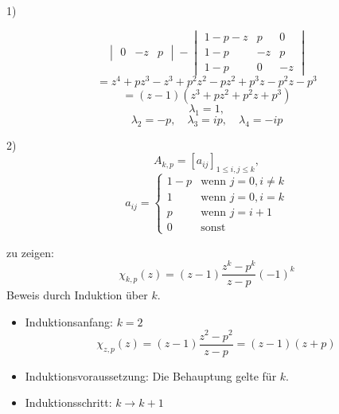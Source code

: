\begin{paragraph}{1)}
\begin{minipage}{0.5\linewidth}
\[\begin{vmatrix}
                                      0 &-z & p \end{vmatrix} 
                     -\begin{vmatrix} 1-p-z & p & 0 \\
                                      1-p & -z & p \\
                                      1-p & 0 & -z \end{vmatrix} \]
  \[ = z^4 + pz^3 - z^3 + p^{2}z^2 - pz^2 + p^{3}z - p^{2}z -p^3 \]
  \[ = (z - 1) (z^{3} + pz^{2} + p^{2}z + p^{3}) \]
  \[ \lambda_{1}= 1, \]
  \[ \lambda_{2}= -p, \quad
     \lambda_{3}= ip, \quad
     \lambda_{4}= -ip\]
  \end{minipage}
\end{paragraph}
\begin{paragraph}{2)}
  \[ A_{k,p} = \left[a_{ij}\right]_{1\leq i,j\leq k}, \]
  \[ a_{ij} = \begin{cases} 1-p &\text{wenn~} j = 0, i \not= k \\
                              1 &\text{wenn~} j = 0, i = k \\
                              p &\text{wenn~} j = i + 1 \\
                              0 &\text{sonst} \end{cases} \]

  zu zeigen: \[ \chi_{k,p}(z) = (z - 1) \frac{z^{k}-p^{k}}{z-p}(-1)^{k} \]
  Beweis durch Induktion über $k$.
  \begin{itemize}
    \item Induktionsanfang: $k = 2$
      \[ \chi_{z,p}(z) = (z - 1) \frac{z^{2}-p^{2}}{z-p} = (z-1)(z+p) \]
    \item Induktionsvoraussetzung: Die Behauptung gelte für $k$.
    \item Induktionsschritt: $k \rightarrow k + 1$
    

\end{itemize}
\end{paragraph}
